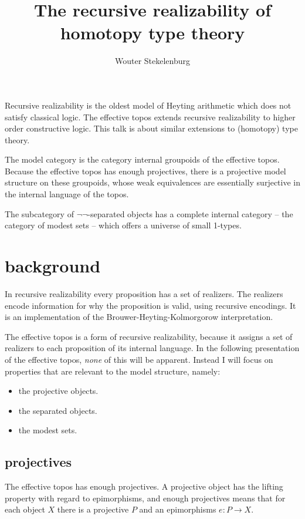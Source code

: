 \documentclass[12pt,a4paper]{article}
\title{The recursive realizability of homotopy type theory}
\author{Wouter Stekelenburg}
\date{}
\theoremstyle{definition}
\begin{document}
\maketitle

Recursive realizability is the oldest model of Heyting arithmetic which does not satisfy classical logic. The effective topos extends recursive realizability to higher order constructive logic. This talk is about similar extensions to (homotopy) type theory.

The model category is the category internal groupoids of the effective topos. Because the effective topos has enough projectives, there is a projective model structure on these groupoids, whose weak equivalences are essentially surjective in the internal language of the topos.

The subcategory of $\neg\neg$-separated objects has a complete internal category -- the category of modest sets -- which offers a universe of small 1-types.

\section{background}
In recursive realizability every proposition has a set of realizers. The realizers encode information for why the proposition is valid, using recursive encodings. It is an implementation of the Brouwer-Heyting-Kolmorgorow interpretation.

The effective topos is a form of recursive realizability, because it assigns a set of realizers to each proposition of its internal language. In the following presentation of the effective topos, \emph{none} of this will be apparent. Instead I will focus on properties that are relevant to the model structure, namely:

\newcommand\Set{\mathsf{Set}}
\newcommand\Eff{\mathsf{Eff}}
\begin{itemize}
\item the projective objects.
\item the separated objects.
\item the modest sets.
\end{itemize}

\subsection{projectives}
The effective topos has enough projectives. A projective object has the lifting property with regard to epimorphisms, and enough projectives means that for each object $X$ there is a projective $P$ and an epimorphisms $e:P\to X$.
\end{document}
